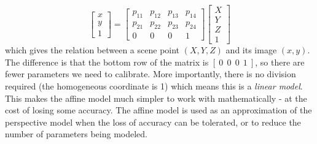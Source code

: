 \begin{equation}
\left [
\begin{matrix}
x \\
y \\
1
\end{matrix}
\right ] = \left [
\begin{matrix}
p_{11} & p_{12} & p_{13} & p_{14} \\
p_{21} & p_{22} & p_{23} & p_{24} \\
0 & 0 & 0 & 1
\end{matrix}
\right ] \left [
\begin{matrix}
X \\
Y \\
Z \\
1
\end{matrix}
\right ]
\end{equation}
which gives the relation between a scene point $(X, Y , Z )$ and its image $(x, y)$. The difference is that the bottom row of the matrix is $[\ 0 \ \ 0 \ \ 0 \ \ 1\ ]$, so there are fewer parameters we need to calibrate. More importantly, there is no division required (the homogeneous coordinate is 1) which means this is a \emph{linear model}. This makes the affine model much simpler to work with mathematically - at the cost of losing some accuracy. The affine model is used as an approximation of the perspective model when the loss of accuracy can be tolerated, or to reduce the number of parameters being modeled.
